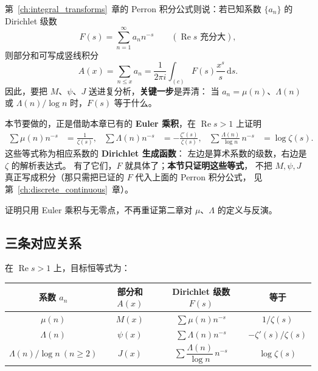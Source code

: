 第~\ref{ch:integral_transforms}~章的 Perron 积分公式则说：若已知系数 $\{a_n\}$ 的
Dirichlet 级数
\[
  F(s)=\sum_{n=1}^{\infty}a_n n^{-s}
  \qquad(\operatorname{Re}s\text{ 充分大}),
\]
则部分和可写成竖线积分
\[
  A(x)=\sum_{n\le x}a_n
  =\frac{1}{2\pi i}\int_{(c)} F(s)\frac{x^s}{s}\,\mathrm{d}s.
\]
因此，要把 $M$、$\psi$、$J$ 送进复分析，\textbf{关键一步}是弄清：
当 $a_n=\mu(n)$、$\Lambda(n)$ 或 $\Lambda(n)/\log n$ 时，$F(s)$ 等于什么。

本节要做的，正是借助本章已有的 \textbf{Euler 乘积}，在 $\operatorname{Re}s>1$ 上证明
\begin{align*}
  \sum\mu(n)n^{-s}&=\frac1{\zeta(s)},&
  \sum\Lambda(n)n^{-s}&=-\frac{\zeta'(s)}{\zeta(s)},&
  \sum\frac{\Lambda(n)}{\log n}\,n^{-s}&=\log\zeta(s).
\end{align*}
这些等式称为相应系数的 \textbf{Dirichlet 生成函数}：
左边是算术系数的级数，右边是 $\zeta$ 的解析表达式。
有了它们，$F$ 就具体了；\textbf{本节只证明这些等式}，
不把 $M,\psi,J$ 真正写成积分（那只需把已证的 $F$ 代入上面的 Perron 积分公式，
见第~\ref{ch:discrete_continuous}~章）。

证明只用 Euler 乘积与无零点，不再重证第二章对 $\mu$、$\Lambda$ 的定义与反演。

\subsection{三条对应关系}

在 $\operatorname{Re}s>1$ 上，目标恒等式为：

\begin{center}
\renewcommand{\arraystretch}{1.55}
{\small
\begin{tabular}{|c|c|c|c|}
\hline
\textbf{系数 $a_n$} &
\textbf{部分和 $A(x)$} &
\textbf{Dirichlet 级数 $F(s)$} &
\textbf{等于} \\
\hline
$\mu(n)$ &
$M(x)$ &
$\displaystyle\sum\mu(n)n^{-s}$ &
$1/\zeta(s)$ \\
\hline
$\Lambda(n)$ &
$\psi(x)$ &
$\displaystyle\sum\Lambda(n)n^{-s}$ &
$-\zeta'(s)/\zeta(s)$ \\
\hline
$\Lambda(n)/\log n\ (n\ge 2)$ &
$J(x)$ &
$\displaystyle\sum\dfrac{\Lambda(n)}{\log n}\,n^{-s}$ &
$\log\zeta(s)$ \\
\hline
\end{tabular}}
\end{center}

